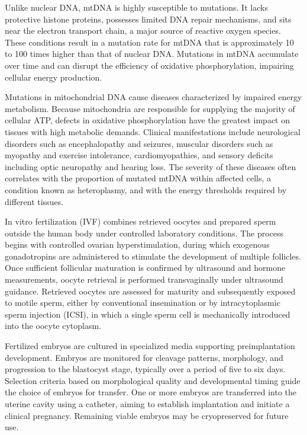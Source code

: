 Unlike nuclear DNA, mtDNA is highly susceptible to mutations. It lacks protective histone proteins, possesses limited DNA repair mechanisms, and sits near the electron transport chain, a major source of reactive oxygen species. These conditions result in a mutation rate for mtDNA that is approximately 10 to 100 times higher than that of nuclear DNA. Mutations in mtDNA accumulate over time and can disrupt the efficiency of oxidative phosphorylation, impairing cellular energy production.

Mutations in mitochondrial DNA cause diseases characterized by impaired energy metabolism. Because mitochondria are responsible for supplying the majority of cellular ATP, defects in oxidative phosphorylation have the greatest impact on tissues with high metabolic demands. Clinical manifestations include neurological disorders such as encephalopathy and seizures, muscular disorders such as myopathy and exercise intolerance, cardiomyopathies, and sensory deficits including optic neuropathy and hearing loss. The severity of these diseases often correlates with the proportion of mutated mtDNA within affected cells, a condition known as heteroplasmy, and with the energy thresholds required by different tissues.

In vitro fertilization (IVF) combines retrieved oocytes and prepared sperm outside the human body under controlled laboratory conditions. The process begins with controlled ovarian hyperstimulation, during which exogenous gonadotropins are administered to stimulate the development of multiple follicles. Once sufficient follicular maturation is confirmed by ultrasound and hormone measurements, oocyte retrieval is performed transvaginally under ultrasound guidance. Retrieved oocytes are assessed for maturity and subsequently exposed to motile sperm, either by conventional insemination or by intracytoplasmic sperm injection (ICSI), in which a single sperm cell is mechanically introduced into the oocyte cytoplasm.

Fertilized embryos are cultured in specialized media supporting preimplantation development. Embryos are monitored for cleavage patterns, morphology, and progression to the blastocyst stage, typically over a period of five to six days. Selection criteria based on morphological quality and developmental timing guide the choice of embryos for transfer. One or more embryos are transferred into the uterine cavity using a catheter, aiming to establish implantation and initiate a clinical pregnancy. Remaining viable embryos may be cryopreserved for future use.


